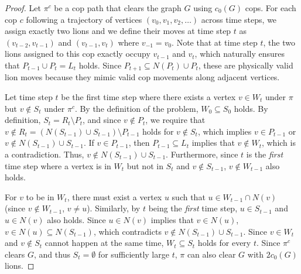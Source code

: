\documentclass[a4paper,UKenglish,cleveref, autoref, thm-restate]{lipics-v2021}
\begin{document}
\begin{proof}
Let $\pi^c$ be a cop path that clears the graph $G$ using $c_0(G)$ cops. For each cop $c$ following a trajectory of vertices $(v_0, v_1, v_2, \dots)$ across time steps, we assign exactly two lions and we define their moves at time step $t$ as $(v_{t-2}, v_{t-1})$ and $(v_{t-1}, v_t)$ where $v_{-1}=v_0$. Note that at time step $t$, the two lions assigned to this cop exactly occupy $v_{t-1}$ and $v_t$, which naturally ensures that $P_{t-1}\cup P_{t}=L_t$ holds. Since $P_{t+1}\subseteq N(P_t)\cup P_t$, these are physically valid lion moves because they mimic valid cop movements along adjacent vertices.

Let time step $t$ be the first time step where there exists a vertex $v \in W_t$ under $\pi$ but $v\notin S_t$ under $\pi^c$. By the definition of the problem, $W_0\subseteq S_0$ holds. By definition, $S_t=R_t\setminus P_t$, and since $v\notin P_t$, we require that $v\notin R_t=(N(S_{t-1})\cup S_{t-1})\setminus P_{t-1}$ holds for $v\notin S_t$, which implies $v\in P_{t-1}$ or $v\notin N(S_{t-1})\cup S_{t-1}$. If $v\in P_{t-1}$, then $P_{t-1}\subseteq L_t$ implies that $v\notin W_t$, which is a contradiction. Thus, $v\notin N(S_{t-1})\cup S_{t-1}$. Furthermore, since $t$ is the \emph{first} time step where a vertex is in $W_t$ but not in $S_t$ and $v\notin S_{t-1}$, $v\notin W_{t-1}$ also holds.

For $v$ to be in $W_t$, there must exist a vertex $u$ such that $u\in W_{t-1}\cap N(v)$ (since $v\notin W_{t-1}$, $v\neq u$). Similarly, by $t$ being the \emph{first} time step, $u\in S_{t-1}$ and $u\in N(v)$ also holds. Since $u\in N(v)$ implies that $v\in N(u)$, $v\in N(u)\subseteq N(S_{t-1})$, which contradicts $v\notin N(S_{t-1})\cup S_{t-1}$. Since $v\in W_t$ and $v\notin S_t$ cannot happen at the same time, $W_t\subseteq S_t$ holds for every $t$. Since $\pi^c$ clears $G$, and thus $S_t=\emptyset$ for sufficiently large $t$, $\pi$ can also clear $G$ with $2c_0(G)$ lions.
\end{proof}
\end{document}
